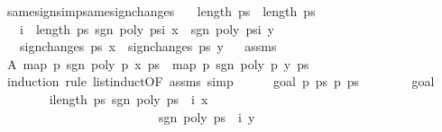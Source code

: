 \begin{isabellebody}
%
\isadelimproof
\isanewline
%
\endisadelimproof
\isanewline
{}\isamarkupfalse%
\ same{\isacharunderscore}signs{\isacharunderscore}imp{\isacharunderscore}same{\isacharunderscore}sign{\isacharunderscore}changes{\isacharcolon}\isanewline
\ \ \ {\isachardoublequoteopen}length\ ps\ {\isacharequal}\ length\ ps{\isacharprime}{\isachardoublequoteclose}\isanewline
\ \ \ {\isachardoublequoteopen}{\isasymforall}i\ {\isacharless}\ length\ ps{\isachardot}\ sgn\ {\isacharparenleft}poly\ {\isacharparenleft}ps{\isacharbang}i{\isacharparenright}\ x{\isacharparenright}\ {\isacharequal}\ sgn\ {\isacharparenleft}poly\ {\isacharparenleft}ps{\isacharprime}{\isacharbang}i{\isacharparenright}\ y{\isacharparenright}{\isachardoublequoteclose}\isanewline
\ \ \ {\isachardoublequoteopen}sign{\isacharunderscore}changes\ ps\ x\ {\isacharequal}\ sign{\isacharunderscore}changes\ ps{\isacharprime}\ y{\isachardoublequoteclose}\isanewline
%
\isadelimproof
%
\endisadelimproof
%
\isatagproof
{}\isamarkupfalse%
{\isacharminus}\isanewline
\ \isamarkupfalse%
\ assms{\isacharparenleft}{}{\isacharparenright}\ \isamarkupfalse%
\ A{\isacharcolon}\ {\isachardoublequoteopen}map\ {\isacharparenleft}{\isasymlambda}p{\isachardot}\ sgn\ {\isacharparenleft}poly\ p\ x{\isacharparenright}{\isacharparenright}\ ps\ {\isacharequal}\ map\ {\isacharparenleft}{\isasymlambda}p{\isachardot}\ sgn\ {\isacharparenleft}poly\ p\ y{\isacharparenright}{\isacharparenright}\ ps{\isacharprime}{\isachardoublequoteclose}\isanewline
\ \ \isamarkupfalse%
\ {\isacharparenleft}induction\ rule{\isacharcolon}\ list{\isacharunderscore}induct{}{\isacharbrackleft}OF\ assms{\isacharparenleft}{}{\isacharparenright}{\isacharbrackright}{\isacharcomma}\ simp{\isacharparenright}\isanewline
\ \ \ \ \isamarkupfalse%
\ {\isacharparenleft}goal{}\ p\ ps\ p{\isacharprime}\ ps{\isacharprime}{\isacharparenright}\isanewline
\ \ \ \ \ \ \isamarkupfalse%
\ goal{}{\isacharparenleft}{}{\isacharparenright}\isanewline
\ \ \ \ \ \ \isamarkupfalse%
\ {\isachardoublequoteopen}{\isasymforall}i{\isacharless}length\ ps{\isachardot}\ sgn\ {\isacharparenleft}poly\ {\isacharparenleft}ps\ {\isacharbang}\ i{\isacharparenright}\ x{\isacharparenright}\ {\isacharequal}\ \isanewline
\ \ \ \ \ \ \ \ \ \ \ \ \ \ \ \ \ \ \ \ \ \ \ \ \ sgn\ {\isacharparenleft}poly\ {\isacharparenleft}ps{\isacharprime}\ {\isacharbang}\ i{\isacharparenright}\ y{\isacharparenright}{\isachardoublequoteclose}\ \isamarkupfalse%

\end{isabellebody}
